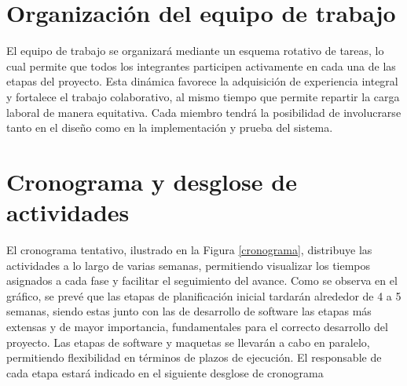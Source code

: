 \documentclass[a4paper,12pt]{article}
\begin{document}
\section{Organización del equipo de trabajo}
El equipo de trabajo se organizará mediante un esquema rotativo de tareas, lo cual permite que todos los integrantes participen activamente en cada una de las etapas del proyecto. Esta dinámica favorece la adquisición de experiencia integral y fortalece el trabajo colaborativo, al mismo tiempo que permite repartir la carga laboral de manera equitativa. Cada miembro tendrá la posibilidad de involucrarse tanto en el diseño como en la implementación y prueba del sistema.

\section{Cronograma y desglose de actividades}
El cronograma tentativo, ilustrado en la Figura \ref{cronograma}, distribuye las actividades a lo largo de varias semanas, permitiendo visualizar los tiempos asignados a cada fase y facilitar el seguimiento del avance.
Como se observa en el gráfico, se prevé que las etapas de planificación inicial tardarán alrededor de 4 a 5 semanas, siendo estas junto con las de desarrollo de software las etapas más extensas y de mayor importancia, fundamentales para el correcto desarrollo del proyecto. Las etapas de software y maquetas se llevarán a cabo en paralelo, permitiendo flexibilidad en términos de plazos de ejecución. El responsable de cada etapa estará indicado en el siguiente desglose de cronograma\\
\end{document}
